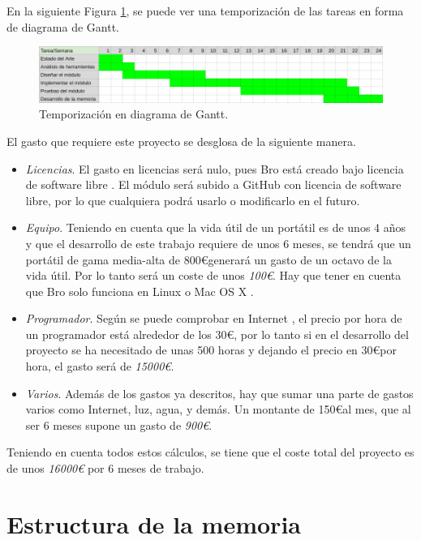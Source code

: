\intro En la siguiente Figura \ref{fig.tempo}, se puede ver una temporización de las tareas en forma de diagrama de Gantt.

\begin{figure}[H]
  \includegraphics[width=1\textwidth]{imagenes/temporizacion.png} 
  \centering
  \caption{Temporización en diagrama de Gantt.}\label{fig.tempo}
\end{figure}

El gasto que requiere este proyecto se desglosa de la siguiente manera.
\begin{itemize}
\item \textit{Licencias}. El gasto en licencias será nulo, pues Bro está creado bajo licencia de software libre \cite{broindex}. El 
módulo será subido a GitHub \cite{repo} con licencia de software libre, por lo que cualquiera podrá usarlo o modificarlo en el futuro.
\item \textit{Equipo}. Teniendo en cuenta que la vida útil de un portátil es de unos 4 años y que el desarrollo de este trabajo 
requiere de unos 6 meses, se tendrá que un portátil de gama media-alta de 800\euro generará un gasto de un octavo de la vida útil. Por 
lo tanto será un coste de unos \textit{100\euro}. Hay que tener en cuenta que Bro solo funciona en Linux o Mac OS X 
\cite{brodownload}.
\item \textit{Programador}. Según se puede comprobar en Internet \cite{tarifa}, el precio por hora de un programador está alrededor de  
los 30\euro, por lo tanto si en el desarrollo del proyecto se ha necesitado de unas 500 horas y dejando el precio en 30\euro por hora, 
el gasto será de \textit{15000\euro}.
\item \textit{Varios}. Además de los gastos ya descritos, hay que sumar una parte de gastos varios como Internet, luz, agua, y 
demás. Un montante de 150\euro al mes, que al ser 6 meses supone un gasto de \textit{900\euro}.
\end{itemize}

\intro Teniendo en cuenta todos estos cálculos, se tiene que el coste total del proyecto es de unos \textit{16000\euro} por 6 meses de 
trabajo.

\section{Estructura de la memoria}

